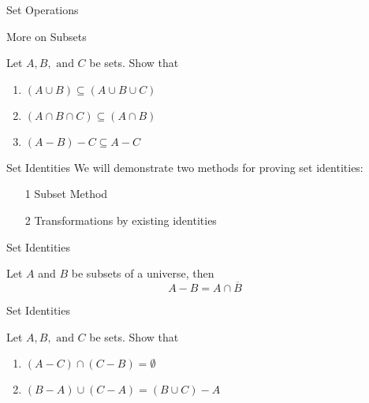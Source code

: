 \documentclass{beamer}
\begin{document}
\begin{frame}{Set Operations}
\end{frame}

\begin{frame}[t]{More on Subsets}
    \begin{example}
        Let $A,B, \text{ and } C$ be sets. Show that \begin{enumerate}
            \item $(A \cup B) \subseteq (A \cup B \cup C)$
            \item $(A \cap B \cap C) \subseteq (A \cap B)$
            \item $(A - B) - C \subseteq A - C$
        \end{enumerate}
    \end{example}
\end{frame}

\begin{frame}{Set Identities}
    We will demonstrate two methods for proving set identities: \begin{enumerate}
        \item[1] Subset Method
        \item[2] Transformations by existing identities
    \end{enumerate}
\end{frame}

\begin{frame}[t]{Set Identities}
    \begin{theorem}
        Let $A$ and $B$ be subsets of a universe, then $$A - B = A \cap \overline{B}$$
    \end{theorem}
\end{frame}

\begin{frame}{}
\end{frame}

\begin{frame}[t]{Set Identities}
    \begin{example}
        Let $A,B, \text{ and } C$ be sets. Show that \begin{enumerate}
            \item $(A - C) \cap (C - B) = \emptyset$
            \item $(B - A) \cup (C - A) = (B \cup C) - A$
        \end{enumerate}
    \end{example}
\end{frame}
\end{document}
